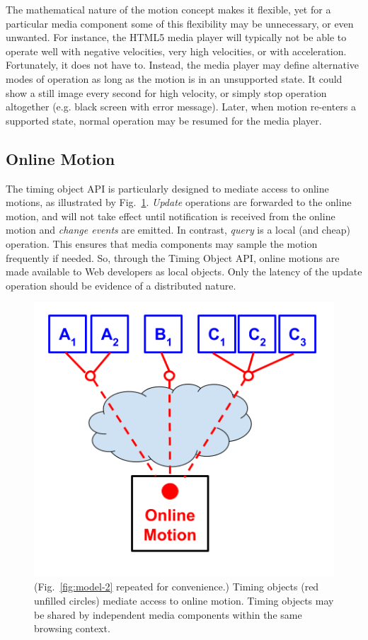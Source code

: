 \documentclass[graybox]{svmult}
\begin{document}
\label{sec:toomuch}

The mathematical nature of the motion concept makes it flexible, yet for a
particular media component some of this flexibility may be unnecessary, or
even unwanted. For instance, the HTML5 media player will typically not be able
to operate well with negative velocities, very high velocities, or with
acceleration. Fortunately, it does not have to. Instead, the media player may
define alternative modes of operation as long as the motion is in an
unsupported state. It could show a still image every second for high velocity,
or simply stop operation altogether (e.g. black screen with error message).
Later, when motion re-enters a supported state, normal operation may be
resumed for the media player.


\subsection{Online Motion}
\label{sec:motionsync}

The timing object API is particularly designed to mediate access to online motions,
as illustrated by Fig.~\ref{fig:model-repeat}. \emph{Update} operations are forwarded to the
online motion, and will not take effect until notification is received from
the online motion and \emph{change events} are emitted. In contrast, \emph{query} is a local
(and cheap) operation. This ensures that media components may sample the
motion frequently if needed. So, through the Timing Object API, online motions
are made available to Web developers as local objects. Only the latency of the
update operation should be evidence of a distributed nature.

\begin{figure}[h]
\centering
\includegraphics[scale=.3]{fig/motion-model-2.png}
\caption{(Fig.~\ref{fig:model-2} repeated for convenience.) Timing objects (red unfilled circles) mediate access to online motion. Timing objects may be shared by independent media components within the same browsing context.}
\label{fig:model-repeat}
\end{figure}
\end{document}

